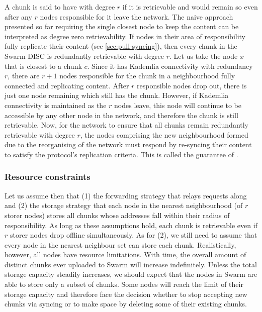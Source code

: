 A chunk is said to have  with degree $r$ if it is retrievable and would remain so even after any $r$ nodes responsible for it leave the network. The naive approach presented so far requiring the single closest node to keep the content can be interpreted as degree zero retrievability. If nodes in their area of responsibility fully replicate their content (see \ref{sec:pull-syncing}), then every chunk in the Swarm DISC is redundantly retrievable with degree $r$. Let us take the node $x$ that is closest to a chunk $c$. Since it has Kademlia connectivity with redundancy $r$, there are $r+1$ nodes responsible for the chunk in a neighbourhood fully connected and replicating content. After $r$ responsible nodes drop out, there is just one node remaining which still has the chunk. However, if Kademlia connectivity is maintained as the $r$ nodes leave, this node will continue to be accessible by any other node in the network, and therefore the chunk is still retrievable. Now, for the network to ensure that all chunks remain redundantly retrievable with degree $r$, the nodes comprising the new neighbourhood formed due to the reorganising of the network must respond by re-syncing their content to satisfy the protocol's replication criteria. This is called the guarantee of .

\subsubsection{Resource constraints}

Let us assume then that (1) the forwarding strategy that relays requests along  and (2) the storage strategy that each node in the nearest neighbourhood (of $r$ storer nodes) stores all chunks whose addresses fall within their radius of responsibility. As long as these assumptions hold, each chunk is retrievable even if $r$ storer nodes drop offline simultaneously. As for (2), we still need to assume that every node in the nearest neighbour set can store each chunk. Realistically, however, all nodes have resource limitations. With time, the overall amount of distinct chunks ever uploaded to Swarm will increase indefinitely. Unless the total storage capacity steadily increases, we should expect that the nodes in Swarm are able to store only a subset of chunks. Some nodes will reach the limit of their storage capacity and therefore face the decision whether to stop accepting new chunks via syncing or to make space by deleting some of their existing chunks. 

